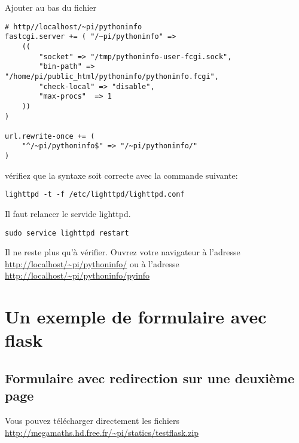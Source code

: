 \documentclass[a4paper,10pt,usenames]{article}
\begin{document}
\begin{list}{}{}
Ajouter au bas du fichier

\begin{lstlisting}
# http//localhost/~pi/pythoninfo
fastcgi.server += ( "/~pi/pythoninfo" =>
    ((
        "socket" => "/tmp/pythoninfo-user-fcgi.sock",
        "bin-path" => "/home/pi/public_html/pythoninfo/pythoninfo.fcgi",
        "check-local" => "disable",
        "max-procs"  => 1
    ))
)

url.rewrite-once += (
    "^/~pi/pythoninfo$" => "/~pi/pythoninfo/"
)
\end{lstlisting}


vérifiez que la syntaxe soit correcte avec la commande suivante:


\begin{lstlisting}
lighttpd -t -f /etc/lighttpd/lighttpd.conf
\end{lstlisting}


Il faut relancer le servide lighttpd.  

\begin{lstlisting}
sudo service lighttpd restart
\end{lstlisting}

Il ne reste plus qu'à vérifier. Ouvrez votre navigateur à l'adresse \url{http://localhost/~pi/pythoninfo/}  ou à l'adresse \url{http://localhost/~pi/pythoninfo/pyinfo}
\end{list}


\section{Un exemple de formulaire avec flask}

\subsection{Formulaire avec redirection sur une deuxième page}


Vous pouvez télécharger directement les fichiers \url{http://megamaths.hd.free.fr/~pi/statics/testflask.zip}

\end{document}
